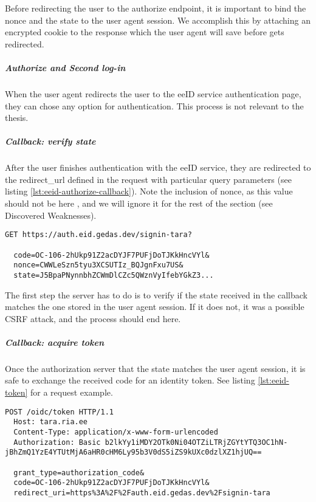 Before redirecting the user to the {authorize} endpoint, it is important to bind the nonce and the state to the user agent session. We accomplish this by attaching an encrypted cookie to the response which the user agent will save before gets redirected.

\subparagraph{Authorize and Second log-in}

When the user agent redirects the user to the eeID service authentication page, they can chose any option for authentication. This process is not relevant to the thesis.

\subparagraph{Callback: verify state}

After the user finishes authentication with the eeID service, they are redirected to the redirect\_url defined in the request with particular query parameters (see listing \ref{lst:eeid-authorize-callback}). Note the inclusion of nonce, as this value should not be here \cite{okta-oidc-spec}, and we will ignore it for the rest of the section (see Discovered Weaknesses).

\begin{lstlisting}[caption={The eeID service authorize redirect response}, label={lst:eeid-authorize-callback}]
  GET https://auth.eid.gedas.dev/signin-tara?
  
  code=OC-106-2hUkp91Z2acDYJF7PUFjDoTJKkHncVYl&
  nonce=CWWLeSzn5tyu3XCSUTIz_BQJgnFxu7US&
  state=J5BpaPNynnbhZCWmDlCZc5QWznVyIfebYGkZ3...
\end{lstlisting}

The first step the server has to do is to verify if the state received in the callback matches the one stored in the user agent session. If it does not, it was a possible CSRF attack, and the process should end here.

\subparagraph{Callback: acquire token}

Once the authorization server that the state matches the user agent session, it is safe to exchange the received code for an identity token. See listing \ref{lst:eeid-token} for a request example.

\begin{lstlisting}[caption={The eeID service token request}, label={lst:eeid-token}]
  POST /oidc/token HTTP/1.1
  Host: tara.ria.ee
  Content-Type: application/x-www-form-urlencoded
  Authorization: Basic b2lkYy1iMDY2OTk0Ni04OTZiLTRjZGYtYTQ3OC1hN-jBhZmQ1YzE4YTUtMjA6aHR0cHM6Ly95b3V0dS5iZS9kUXc0dzlXZ1hjUQ==

  grant_type=authorization_code&
  code=OC-106-2hUkp91Z2acDYJF7PUFjDoTJKkHncVYl&
  redirect_uri=https%3A%2F%2Fauth.eid.gedas.dev%2Fsignin-tara
\end{lstlisting}

